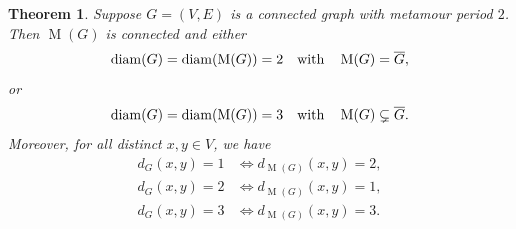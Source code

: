 \documentclass[12pt]{amsart}
\newtheorem{theorem}{Theorem}[section]
\theoremstyle{definition}
\theoremstyle{remark}
\numberwithin{equation}{section}
\numberwithin{figure}{section}
\newcommand{\M}{\operatorname{M}}
\newcommand{\diam}{\operatorname{diam}}
\begin{document}
\begin{theorem} \label{thm: period 2 metamour diameter constraints}
    Suppose $G=(V,E)$ is a connected graph with metamour period $2$. Then $\M(G)$ is connected and either
    \[ \diam(G) = \diam(\M(G)) = 2 \quad \textup{with} \quad \M(G)=\overline{G},\]
    or
    \[ \diam(G) = \diam(\M(G)) = 3 \quad \textup{with} \quad \M(G)\subsetneq\overline{G}.\]
    Moreover, for all distinct $x,y\in V$, we have
    \begin{align*} 
        d_G(x,y)=1 &\iff d_{\M(G)}(x,y) = 2,\\ 
        d_G(x,y)=2 &\iff d_{\M(G)}(x,y) = 1,\\ 
        d_G(x,y)=3 &\iff d_{\M(G)}(x,y) = 3.
    \end{align*}
    
\end{theorem}
\end{document}
